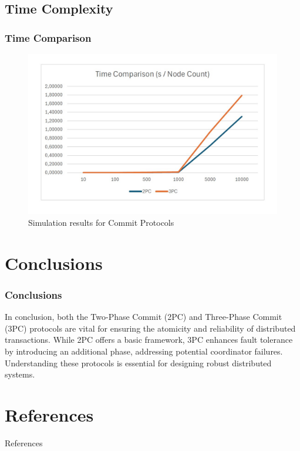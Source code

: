\documentclass[11pt]{beamer}              %
\begin{document}
\subsection{Time Complexity}
\begin{frame}
\frametitle{Time Comparison}
\begin{figure}
    \centering
    \includegraphics[scale=0.44]{figures/3PC_test.jpg}
    \caption{Simulation results for Commit Protocols}
    \label{fig:3pc_test}
\end{figure}
\end{frame}







\section{Conclusions}
\begin{frame}
\frametitle{Conclusions}
In conclusion, both the Two-Phase Commit (2PC) and Three-Phase Commit (3PC) protocols are vital for ensuring the atomicity and reliability of distributed transactions. While 2PC offers a basic framework, 3PC enhances fault tolerance by introducing an additional phase, addressing potential coordinator failures. Understanding these protocols is essential for designing robust distributed systems.

\end{frame}

\section*{References}
\begin{frame}{References}
\tiny


\end{frame}




\thankslide
\end{document}
